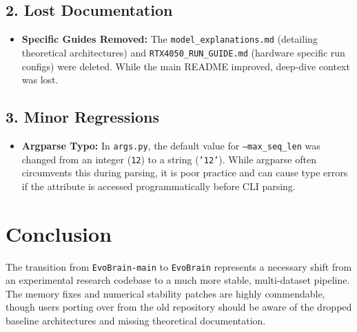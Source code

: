\documentclass{article}
\begin{document}
\subsection*{2. Lost Documentation}
\begin{itemize}[label=\textcolor{red}{$\bullet$}]
    \item \textbf{Specific Guides Removed:} The \texttt{model\_explanations.md} (detailing theoretical architectures) and \texttt{RTX4050\_RUN\_GUIDE.md} (hardware specific run configs) were deleted. While the main README improved, deep-dive context was lost.
\end{itemize}

\subsection*{3. Minor Regressions}
\begin{itemize}[label=\textcolor{orange}{$\bullet$}]
    \item \textbf{Argparse Typo:} In \texttt{args.py}, the default value for \texttt{--max\_seq\_len} was changed from an integer (\texttt{12}) to a string (\texttt{'12'}). While argparse often circumvents this during parsing, it is poor practice and can cause type errors if the attribute is accessed programmatically before CLI parsing.
\end{itemize}

\section*{Conclusion}
The transition from \texttt{EvoBrain-main} to \texttt{EvoBrain} represents a necessary shift from an experimental research codebase to a much more stable, multi-dataset pipeline. The memory fixes and numerical stability patches are highly commendable, though users porting over from the old repository should be aware of the dropped baseline architectures and missing theoretical documentation.
\end{document}
